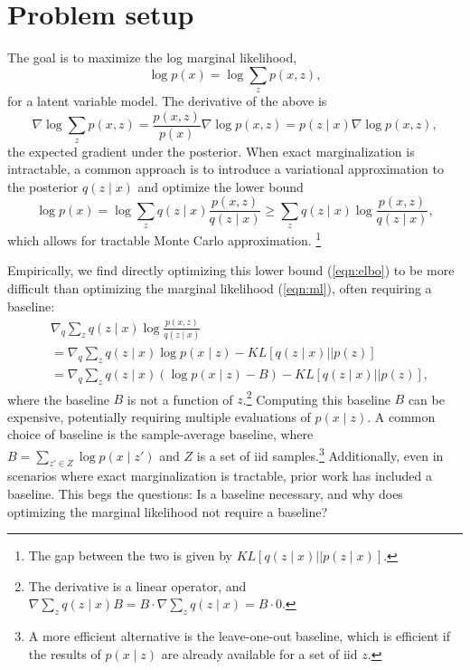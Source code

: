 \documentclass[12pt]{article}
\begin{document}
\section{Problem setup}
The goal is to maximize the log marginal likelihood,
\begin{equation}
\label{eqn:ml}
\log p(x) = \log \sum_z p(x,z),
\end{equation}
for a latent variable model.
The derivative of the above is 
\begin{equation}
\label{eqn:ml-grad}
\nabla \log \sum_z p(x,z)
= \frac{p(x,z)}{p(x)}\nabla \log p(x,z) = 
p(z\mid x)\nabla \log p(x,z),
\end{equation}
the expected gradient under the posterior.
When exact marginalization is intractable,
a common approach is to introduce a variational approximation to the posterior $q(z\mid x)$
and optimize the lower bound
\begin{equation}
\label{eqn:elbo}
\log p(x)
= \log \sum_z q(z\mid x) \frac{p(x,z)}{q(z\mid x)}
\ge \sum_z q(z\mid x) \log \frac{p(x,z)}{q(z\mid x)},
\end{equation}
which allows for tractable Monte Carlo approximation.
\footnote{
The gap between the two is given by $KL[q(z\mid x) || p(z \mid x)]$.
}

Empirically, we find directly optimizing this lower bound (\ref{eqn:elbo}) to be more difficult than
optimizing the marginal likelihood (\ref{eqn:ml}), often requiring a baseline:
\begin{equation}
\label{eqn:baseline}
\begin{aligned}
&\nabla_q \sum_z q(z\mid x) \log \frac{p(x,z)}{q(z\mid x)}\\
&= \nabla_q \sum_z q(z\mid x) \log p(x\mid z) - KL[q(z\mid x) || p(z)]\\
&= \nabla_q \sum_z q(z\mid x) (\log p(x\mid z) - B) - KL[q(z\mid x) || p(z)],
\end{aligned}
\end{equation}
where the baseline $B$ is not a function of $z$.\footnote{
The derivative is a linear operator, and
$\nabla\sum_z q(z\mid x)B = B\cdot\nabla \sum_z q(z\mid x) = B \cdot 0$.
}
Computing this baseline $B$ can be expensive,
potentially requiring multiple evaluations of $p(x\mid z)$.
A common choice of baseline is the sample-average baseline, where
$B = \sum_{z' \in Z} \log p(x\mid z')$
and $Z$ is a set of iid samples.\footnote{
A more efficient alternative is the leave-one-out baseline,
which is efficient if the results of $p(x\mid z)$ are already available
for a set of iid $z$.
}
Additionally, even in scenarios where exact marginalization is tractable,
prior work has included a baseline. This begs the questions:
Is a baseline necessary, and why does optimizing the marginal likelihood
not require a baseline?
\end{document}
